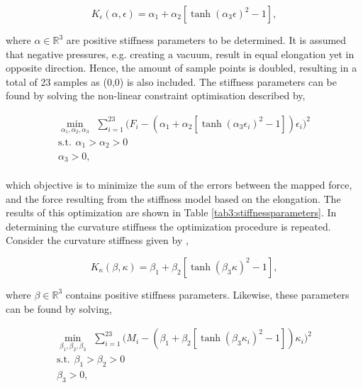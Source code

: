 \begin{equation}
    K_\epsilon(\alpha,\epsilon) =  \alpha_1 + \alpha_2 [\tanh({\alpha_3 \epsilon})^2 -1],
\end{equation}


where $\alpha \in \mathbb{R}^3$ are positive stiffness parameters to be determined. It is assumed that negative pressures, e.g. creating a vacuum, result in equal elongation yet in opposite direction. Hence, the amount of sample points is doubled, resulting in a total of 23 samples as (0,0) is also included. The stiffness parameters can be found by solving the non-linear constraint optimisation described by,


\begin{equation}
\begin{aligned}
\min_{\alpha_1,\alpha_2,\alpha_3} \hspace{5pt} \sum_{i=1}^{23}\Big(F_i -  (\alpha_1 + \alpha_2 [\tanh({\alpha_3 \epsilon_i})^2 -1])\epsilon_i\Big)^2    \\ 
\text{s.t.} \hspace{5pt} \alpha_1 > \alpha_2 > 0 \\
\alpha_3 > 0, \\ 
\label{eq3:Keopt}
\end{aligned}
\end{equation}

which objective is to minimize the sum of the errors between the mapped force, and the force resulting from the stiffness model based on the elongation. The results of this optimization are shown in Table \ref{tab3:stiffnessparameters}. In determining the curvature stiffness the optimization procedure is repeated. Consider the curvature stiffness given by \cite{Caasenbrood2020StiffnessModel},

\begin{equation}
    K_\kappa(\beta,\kappa) =  \beta_1 + \beta_2 [\tanh({\beta_3 \kappa})^2 -1],
\end{equation}

where $\beta \in \mathbb{R}^3$ contains positive stiffness parameters. Likewise, these parameters can be found by solving,

\begin{equation}
\begin{aligned}
\min_{\beta_1,\beta_2,\beta_3} \hspace{5pt} \sum_{i=1}^{23}\big(M_i -  (\beta_1 + \beta_2 [\tanh({\beta_3 {\kappa_i}})^2 -1]){\kappa_i}\Big)^2    \\ 
\text{s.t.} \hspace{5pt} \beta_1 > \beta_2 > 0 \\
\beta_3 > 0, \\ 
\label{eq3:Kkopt}
\end{aligned}
\end{equation}


